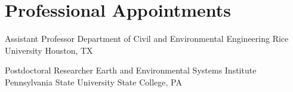\section{Professional Appointments}

{Assistant Professor}
{Department of Civil and Environmental Engineering}
{Rice University}
{Houston, TX}
{}

{Postdoctoral Researcher}
{Earth and Environmental Systems Institute}
{Pennsylvania State University}
{State College, PA}
{}
